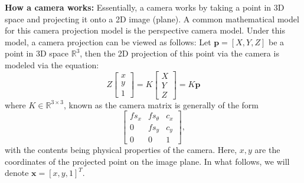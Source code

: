 {\color{red}
\textbf{How a camera works:}
\newline
Essentially, a camera works by taking a point in 3D space and projecting it onto a 2D image (plane). A common mathematical model for this camera projection model is the perspective camera model. Under this model, a camera projection can be viewed as follows: 
\newline
Let $\mathbf{p} = [X,Y,Z]$ be a point in 3D space $\mathbb{R}^3$, then the 2D projection of this point via the camera is modeled via the equation:
\begin{equation}
    Z
    \begin{bmatrix}
        x \\
        y \\
        1
    \end{bmatrix}
    = K
     \begin{bmatrix}
        X \\
        Y \\
        Z
    \end{bmatrix}
    = K\mathbf{p}
\end{equation}
where $K \in \mathbb{R}^{3 \times 3}$, known as the camera matrix is generally of the form
\begin{equation*}
    \begin{bmatrix}
        fs_x  & fs_{\theta} & c_x \\
        0 & fs_y & c_y \\
        0 & 0 & 1
    \end{bmatrix},
\end{equation*} with the contents being physical properties of the camera. 
\newline
Here, $x,y$ are the coordinates of the projected point on the image plane. In what follows, we will denote $\mathbf{x} = [x,y,1]^{T}$. 

}

